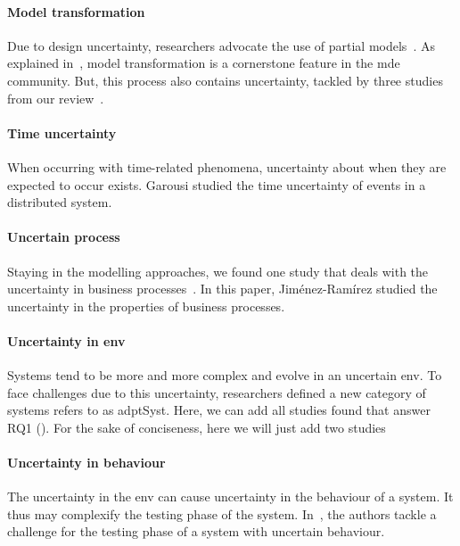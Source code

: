 \paragraph{Model transformation}
Due to design uncertainty, researchers advocate the use of partial models~\cite{DBLP:conf/icse/FamelisSC12}.
As explained in~, model transformation is a cornerstone feature in the \gls{mde} community.
But, this process also contains uncertainty, tackled by three studies from our review~\cite{DBLP:conf/models/BurguenoBMV18, DBLP:conf/sle/EramoPR15, DBLP:conf/icse/EramoPR14}.
	
\paragraph{Time uncertainty}
When occurring with time-related phenomena, uncertainty about when they are expected to occur exists.
Garousi \etal studied the time uncertainty of events in a distributed system.
	
\paragraph{Uncertain process}
Staying in the modelling approaches, we found one study that deals with the uncertainty in business processes~\cite{DBLP:journals/infsof/Jimenez-RamirezW0V15}.
In this paper, Jiménez-Ramírez \etal studied the uncertainty in the properties of business processes.	
	
\paragraph{Uncertainty in \gls{env}}
Systems tend to be more and more complex and evolve in an uncertain \gls{env}.
To face challenges due to this uncertainty, researchers defined a new category of systems refers to as \gls{adptSyst}.
Here, we can add all studies found that answer RQ1 (\cf {}).
For the sake of conciseness, here we will just add two studies~\cite{DBLP:conf/dagstuhl/EsfahaniM10, DBLP:conf/ecmdafa/ZhangSAYON16}

\paragraph{Uncertainty in \gls{behaviour}}
The uncertainty in the \gls{env} can cause uncertainty in the behaviour of a system.
It thus may complexify the testing phase of the system.
In~\cite{DBLP:journals/sosym/Zhang00NO19}, the authors tackle a challenge for the testing phase of a system with uncertain \gls{behaviour}.
	

